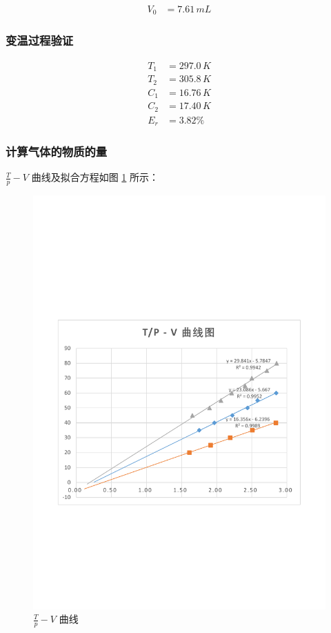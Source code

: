 \documentclass[12pt]{article}
\begin{document}
\begin{align*}
    V_0 &= 7.61 \, \text{$mL$}
\end{align*}

\subsubsection{\normalfont 变温过程验证}

\begin{align*}
    T_1 &= 297.0 \, \text{$K$} \\
    T_2 &= 305.8 \, \text{$K$} \\
    C_1 &= 16.76 \, \text{$K$} \\
    C_2 &= 17.40 \, \text{$K$} \\
    E_r &= 3.82\%
\end{align*}

\subsubsection{\normalfont 计算气体的物质的量}

$\frac{T}{p}-V$ 曲线及拟合方程如图 \ref{fig:table_data7} 所示：

\begin{figure}[H] %
    \centering
    \includegraphics[width=\textwidth]{./figures/F1.pdf} 
    \caption{$\frac{T}{p}-V$ 曲线}
    \label{fig:table_data7}
\end{figure}
\end{document}
